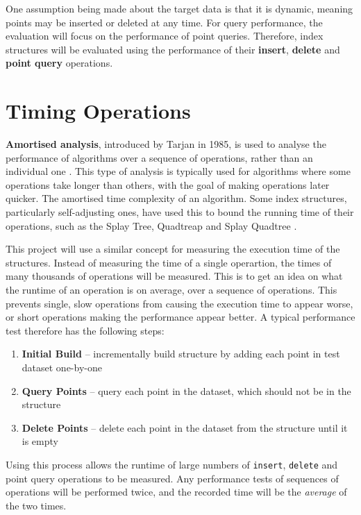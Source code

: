 One assumption being made about the target data is that it is dynamic, meaning points may be inserted or deleted at any time. For query performance, the evaluation will focus on the performance of point queries. Therefore, index structures will be evaluated using the performance of their \textbf{insert}, \textbf{delete} and \textbf{point query} operations.

\section{Timing Operations}
\label{sec:timing-operations}

\textbf{Amortised analysis}, introduced by Tarjan in 1985, is used to analyse the performance of algorithms over a sequence of operations, rather than an individual one \cite{amortised-analysis}. This type of analysis is typically used for algorithms where some operations take longer than others, with the goal of making operations later quicker. The amortised time complexity of an algorithm. Some index structures, particularly self-adjusting ones, have used this to bound the running time of their operations, such as the Splay Tree, Quadtreap and Splay Quadtree \cite{splay-tree, quadtreap, splay-quadtree}.

This project will use a similar concept for measuring the execution time of the structures. Instead of measuring the time of a single operartion, the times of many thousands of operations will be measured. This is to get an idea on what the runtime of an operation is on average, over a sequence of operations. This prevents single, slow operations from causing the execution time to appear worse, or short operations making the performance appear better. A typical performance test therefore has the following steps:
\begin{enumerate}
	\item \textbf{Initial Build} -- incrementally build structure by adding each point in test dataset one-by-one
	\item \textbf{Query Points} -- query each point in the dataset, which should not be in the structure
	\item \textbf{Delete Points} -- delete each point in the dataset from the structure until it is empty
\end{enumerate}
Using this process allows the runtime of large numbers of \texttt{insert}, \texttt{delete} and point query operations to be measured. Any performance tests of sequences of operations will be performed twice, and the recorded time will be the \textit{average} of the two times.

